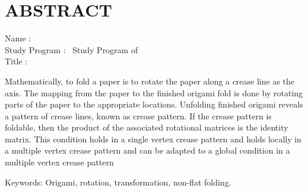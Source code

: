 %
%
%

\chapter*{\normalsize ABSTRACT}
\begin{singlespace}
\vspace*{0.2cm}

\noindent 
Name : \penulis \\ %
Study Program : \jenjanginggris~Study Program of~\bidanginggris \\ %
Title : \judulInggris \\ %

\vspace*{0.5cm}

\noindent Mathematically, to fold a paper is to rotate the paper along a crease line as the axis. The mapping from the paper to the finished origami fold is done by rotating parts of the paper to the appropriate locations. Unfolding finished origami reveals a pattern of crease lines, known as crease pattern. If the crease pattern is foldable, then the product 
of the associated rotational matrices is the identity matrix. This condition holds in a single vertex crease pattern and holds locally in a multiple vertex crease pattern and can be adapted to a global condition in a multiple vertex crease pattern

\bigskip

\noindent \lipsum[1]

\vspace*{0.5cm}

\noindent Keywords: Origami, rotation, transformation, non-flat folding.\\ %
\end{singlespace}

\newpage 